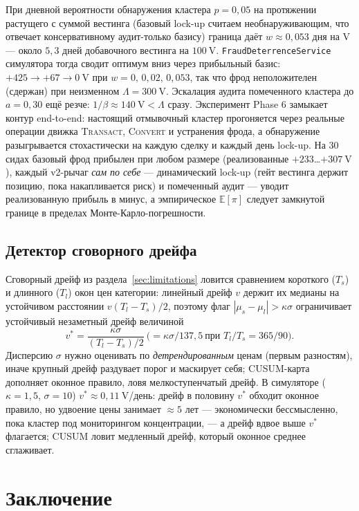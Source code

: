 \documentclass[11pt]{article}
\theoremstyle{plain}
\theoremstyle{definition}
\theoremstyle{remark}
\newcommand{\V}{\mathrm{V}}
\begin{document}
При дневной вероятности обнаружения кластера $p=0{,}05$ на протяжении растущего с суммой вестинга (базовый lock-up считаем необнаруживающим, что отвечает консервативному аудит-только базису) граница даёт $w\approx0{,}053$ дня на V --- около $5{,}3$ дней добавочного вестинга на $100~\V$. \texttt{FraudDeterrenceService} симулятора тогда сводит оптимум вниз через прибыльный базис: $+425\to+67\to0~\V$ при $w=0,\,0{,}02,\,0{,}053$, так что фрод неположителен (сдержан) при неизменном $\Lambda=300~\V$. Эскалация аудита помеченного кластера до $a=0{,}30$ ещё резче: $1/\beta\approx140~\V<\Lambda$ сразу. Эксперимент Phase 6 замыкает контур end-to-end: настоящий отмывочный кластер прогоняется через реальные операции движка \textsc{Transact}, \textsc{Convert} и устранения фрода, а обнаружение разыгрывается стохастически на каждую сделку и каждый день lock-up. На $30$ сидах базовый фрод прибылен при любом размере (реализованные $+233$\dots$+307~\V$), каждый v2-рычаг \emph{сам по себе} --- динамический lock-up (гейт вестинга держит позицию, пока накапливается риск) и помеченный аудит --- уводит реализованную прибыль в минус, а эмпирическое $\mathbb E[\pi]$ следует замкнутой границе в пределах Монте-Карло-погрешности.

\subsection{Детектор сговорного дрейфа}

Сговорный дрейф из раздела~\ref{sec:limitations} ловится сравнением короткого ($T_s$) и длинного ($T_l$) окон цен категории: линейный дрейф $v$ держит их медианы на устойчивом расстоянии $v(T_l-T_s)/2$, поэтому флаг $|\mu_s-\mu_l|>\kappa\sigma$ ограничивает устойчивый незаметный дрейф величиной
\[
v^\ast=\frac{\kappa\sigma}{(T_l-T_s)/2}\ \bigl(=\kappa\sigma/137{,}5\ \text{при }T_l/T_s=365/90\bigr).
\]
Дисперсию $\sigma$ нужно оценивать по \emph{детрендированным} ценам (первым разностям), иначе крупный дрейф раздувает порог и маскирует себя; CUSUM-карта дополняет оконное правило, ловя мелкоступенчатый дрейф. В симуляторе ($\kappa=1{,}5$, $\sigma=10$) $v^\ast\approx0{,}11~\V$/день: дрейф в половину $v^\ast$ обходит оконное правило, но удвоение цены занимает ${\approx}5$ лет --- экономически бессмысленно, пока кластер под мониторингом концентрации, --- а дрейф вдвое выше $v^\ast$ флагается; CUSUM ловит медленный дрейф, который оконное среднее сглаживает.

\section{Заключение}
\end{document}
